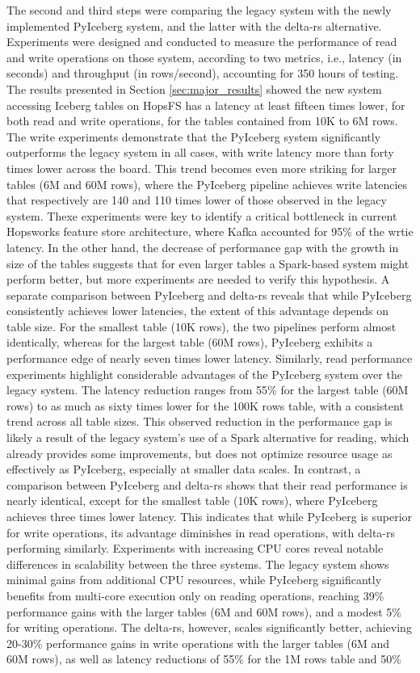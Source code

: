 The second and third steps were comparing the legacy system with the newly implemented PyIceberg system, and the latter with the delta-rs alternative. Experiments were designed and conducted to measure the performance of read and write operations on those system, according to two metrics, i.e., latency (in seconds) and throughput (in rows/second), accounting for 350 hours of testing. The results presented in Section \ref{sec:major_results} showed the new system accessing Iceberg tables on \gls{HopsFS} has a latency at least fifteen times lower, for both read and write operations, for the tables contained from 10K to 6M rows. The write experiments demonstrate that the PyIceberg system significantly outperforms the legacy system in all cases, with write latency more than forty times lower across the board. This trend becomes even more striking for larger tables (6M and 60M rows), where the PyIceberg pipeline achieves write latencies that respectively are 140 and 110 times lower of those observed in the legacy system. Thexe experiments were key to identify a critical bottleneck in current Hopsworks feature store architecture, where Kafka accounted for 95\% of the wrtie latency. In the other hand, the decrease of performance gap with the growth in size of the tables suggests that for even larger tables a Spark-based system might perform better, but more experiments are needed to verify this hypothesis. A separate comparison between PyIceberg and delta-rs reveals that while PyIceberg consistently achieves lower latencies, the extent of this advantage depends on table size. For the smallest table (10K rows), the two pipelines perform almost identically, whereas for the largest table (60M rows), PyIceberg exhibits a performance edge of nearly seven times lower latency. Similarly, read performance experiments highlight considerable advantages of the PyIceberg system over the legacy system. The latency reduction ranges from 55\% for the largest table (60M rows) to as much as sixty times lower for the 100K rows table, with a consistent trend across all table sizes. This observed reduction in the performance gap is likely a result of the legacy system's use of a Spark alternative for reading, which already provides some improvements, but does not optimize resource usage as effectively as PyIceberg, especially at smaller data scales. In contrast, a comparison between PyIceberg and delta-rs shows that their read performance is nearly identical, except for the smallest table (10K rows), where PyIceberg achieves three times lower latency. This indicates that while PyIceberg is superior for write operations, its advantage diminishes in read operations, with delta-rs performing similarly. Experiments with increasing \gls{CPU} cores reveal notable differences in scalability between the three systems. The legacy system shows minimal gains from additional \gls{CPU} resources, while PyIceberg significantly benefits from multi-core execution only on reading operations, reaching 39\% performance gains with the larger tables (6M and 60M rows), and a modest 5\% for writing operations. The delta-rs, however, scales significantly better, achieving 20-30\% performance gains in write operations with the larger tables (6M and 60M rows), as well as latency reductions of 55\% for the 1M rows table and 50\% 